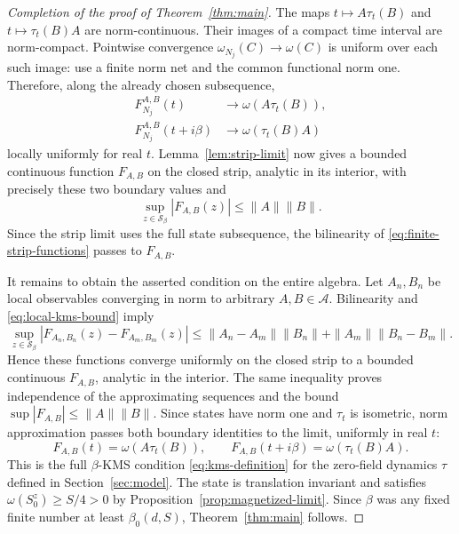 \begin{proof}[Completion of the proof of Theorem~\ref{thm:main}]
The maps \(t\mapsto A\tau_t(B)\) and
\(t\mapsto\tau_t(B)A\) are norm-continuous.  Their images of a
compact time interval are norm-compact.  Pointwise convergence
\(\omega_{N_j}(C)\to\omega(C)\) is uniform over each such image:
use a finite norm net and the common functional norm one.  Therefore,
along the already chosen subsequence,
\begin{align*}
 F_{N_j}^{A,B}(t)&\longrightarrow\omega(A\tau_t(B)),\\
 F_{N_j}^{A,B}(t+i\beta)&\longrightarrow\omega(\tau_t(B)A)
\end{align*}
locally uniformly for real \(t\).  Lemma~\ref{lem:strip-limit}
now gives a bounded continuous function \(F_{A,B}\) on the closed
strip, analytic in its interior, with precisely these two boundary
values and
\begin{equation}\label{eq:local-kms-bound}
 \sup_{z\in\mathcal S_\beta}|F_{A,B}(z)|\leq\|A\|\|B\|.
\end{equation}
Since the strip limit uses the full state subsequence, the bilinearity of
\eqref{eq:finite-strip-functions} passes to \(F_{A,B}\).

It remains to obtain the asserted condition on the entire algebra.
Let \(A_n,B_n\) be local observables converging in norm to arbitrary
\(A,B\in\mathcal A\).  Bilinearity and
\eqref{eq:local-kms-bound} imply
\[
 \sup_{z\in\mathcal S_\beta}
       |F_{A_n,B_n}(z)-F_{A_m,B_m}(z)|
 \leq \|A_n-A_m\|\|B_n\|
      +\|A_m\|\|B_n-B_m\|.
\]
Hence these functions converge uniformly on the closed strip to a
bounded continuous \(F_{A,B}\), analytic in the interior.  The same
inequality proves independence of the approximating sequences and
the bound \(\sup|F_{A,B}|\leq\|A\|\|B\|\).  Since states have
norm one and \(\tau_t\) is isometric, norm approximation passes
both boundary identities to the limit, uniformly in real \(t\):
\[
 F_{A,B}(t)=\omega(A\tau_t(B)),\qquad
 F_{A,B}(t+i\beta)=\omega(\tau_t(B)A).
\]
This is the full \(\beta\)-KMS condition \eqref{eq:kms-definition}
for the zero-field dynamics \(\tau\) defined in Section~\ref{sec:model}.  The state is translation invariant and satisfies
\(\omega(S_0^z)\geq S/4>0\) by
Proposition~\ref{prop:magnetized-limit}.  Since \(\beta\) was any
fixed finite number at least \(\beta_0(d,S)\), Theorem~\ref{thm:main}
follows.
\end{proof}
